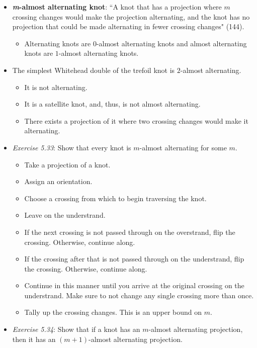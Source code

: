 \documentclass[titlepage]{article}
\numberwithin{figure}{section}
\numberwithin{table}{section}
\numberwithin{equation}{section}
\newcommand{\dq}[2]{``#1" (#2).}
\begin{document}
\begin{itemize}
\begin{figure}[h!]
        \label{fig:tongue}
    \end{figure}
    \item \textbf{\emph{m}-almost alternating knot}: \dq{A knot that has a projection where $m$ crossing changes would make the projection alternating, and the knot has no projection that could be made alternating in fewer crossing changes}{144}
    \begin{itemize}
        \item Alternating knots are $0$-almost alternating knots and almost alternating knots are $1$-almost alternating knots.
    \end{itemize}
    \item The simplest Whitehead double of the trefoil knot is $2$-almost alternating.
    \begin{itemize}
        \item It is not alternating.
        \item It is a satellite knot, and, thus, is not almost alternating.
        \item There exists a projection of it where two crossing changes would make it alternating.
    \end{itemize}
    \item \emph{Exercise 5.33}: Show that every knot is $m$-almost alternating for some $m$.
    \begin{itemize}
        \item Take a projection of a knot.
        \item Assign an orientation.
        \item Choose a crossing from which to begin traversing the knot.
        \item Leave on the understrand.
        \item If the next crossing is not passed through on the overstrand, flip the crossing. Otherwise, continue along.
        \item If the crossing after that is not passed through on the understrand, flip the crossing. Otherwise, continue along.
        \item Continue in this manner until you arrive at the original crossing on the understrand. Make sure to not change any single crossing more than once.
        \item Tally up the crossing changes. This is an upper bound on $m$.
    \end{itemize}
    \item \emph{Exercise 5.34}: Show that if a knot has an $m$-almost alternating projection, then it has an $(m+1)$-almost alternating projection.

\end{itemize}
\end{document}
